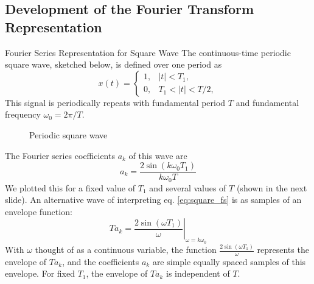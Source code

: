 \subsection{Development of the Fourier Transform Representation}

\begin{frame}[plain]{Fourier Series Representation for Square Wave}
        The continuous-time periodic square wave, sketched below, is defined over one period as
        \begin{equation*}
            x(t) = \begin{cases}
                1, & |t| <T_1,\\
                0, & T_1 < |t| < T/2,
            \end{cases}
        \end{equation*}
        This signal is periodically repeats with fundamental period $T$ and fundamental frequency $\omega_0 = 2\pi/T$.
    {
        \begin{figure}
          \centering
          
          \caption{Periodic square wave}\label{fi:example02_periodic_square_wave }
        \end{figure}
    }
\end{frame}



\begin{frame}
    The Fourier series coefficients $a_k$ of this wave are
    \begin{equation}\label{eq:square_fs}
        a_k = \frac{2\sin(k\omega_0T_1)}{k\omega_0T}
    \end{equation}
    We plotted this for a fixed value of $T_1$ and several values of $T$ (shown in the next slide). An alternative wave of interpreting eq. \ref{eq:square_fs} is as samples of an envelope function:
    \begin{equation*}
        Ta_k = \left.\frac{2\sin(\omega T_1)}{\omega}\right|_{\omega=k\omega_0}
    \end{equation*}
    \pause
    With $\omega$ thought of as a continuous variable, the function $\frac{2\sin(\omega T_1)}{\omega}$ represents the envelope of $Ta_k$, and the coefficients $a_k$ are simple equally spaced samples of this envelope. 
    For fixed $T_1$, the envelope of $Ta_k$ is independent of $T$.
    \pause
    

\end{frame}

